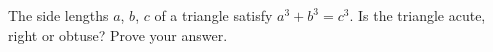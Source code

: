 The side lengths $a$, $b$, $c$ of a triangle satisfy $a^3+b^3=c^3$. Is the triangle acute, right or obtuse? Prove your answer.
